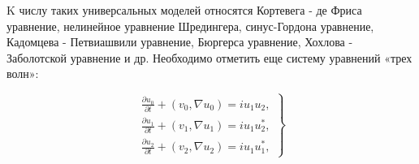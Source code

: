 \documentclass[10pt]{article}
\begin{document}
$\mathrm{K}$ числу таких универсальных моделей относятся Кортевега - де Фриса уравнение, нелинейное уравнение Шредингера, синус-Гордона уравнение, Кадомцева - Петвиашвили уравнение, Бюргерса уравнение, Хохлова - Заболотской уравнение и др. Необходимо отметить еще систему уравнений «трех волн»:



\[

\left.\begin{array}{c}

\frac{\partial u_{0}}{\partial t}+\left(v_{0}, \nabla u_{0}\right)=i u_{1} u_{2}, \\

\frac{\partial u_{1}}{\partial t}+\left(v_{1}, \nabla u_{1}\right)=i u_{1} u_{2}^{*}, \\

\frac{\partial u_{2}}{\partial t}+\left(v_{2}, \nabla u_{2}\right)=i u_{1} u_{1}^{*},

\end{array}\right\}

\]
\end{document}

